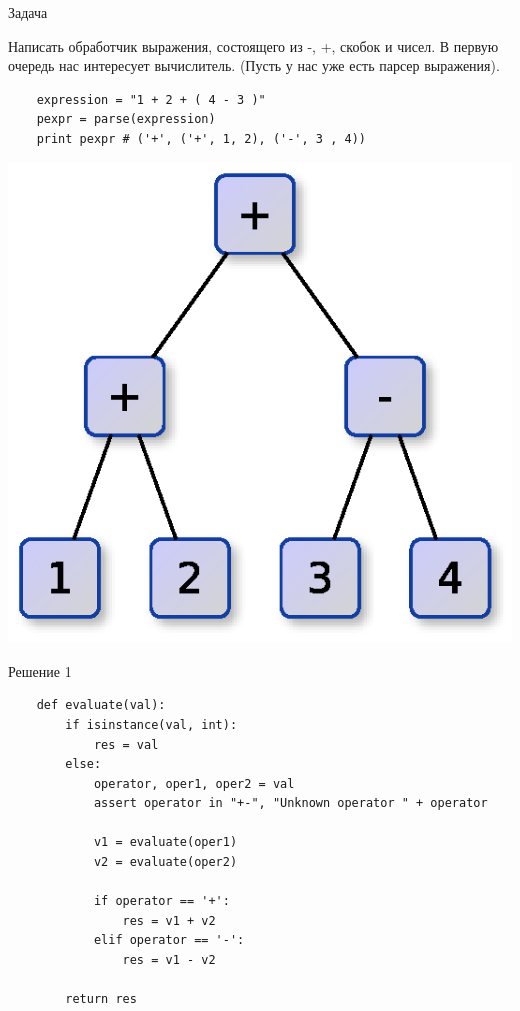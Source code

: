 \documentclass{article}
\begin{document}
\LARGE

\begin{center} Задача \end{center}
    Написать обработчик выражения, состоящего из -, +, скобок и чисел.
    В первую очередь нас интересует вычислитель.
    (Пусть у нас уже есть парсер выражения).

\begin{lstlisting}
    expression = "1 + 2 + ( 4 - 3 )"
    pexpr = parse(expression)
    print pexpr # ('+', ('+', 1, 2), ('-', 3 , 4))
\end{lstlisting}
    \begin{center} \includegraphics{images/parse_tree.eps} \end{center}     
\newpage

\begin{center} Решение 1 \end{center}
\begin{lstlisting}
    def evaluate(val):
        if isinstance(val, int):
            res = val
        else:
            operator, oper1, oper2 = val
            assert operator in "+-", "Unknown operator " + operator

            v1 = evaluate(oper1)
            v2 = evaluate(oper2)

            if operator == '+':
                res = v1 + v2
            elif operator == '-':
                res = v1 - v2

        return res
\end{lstlisting}
\newpage
\end{document}
